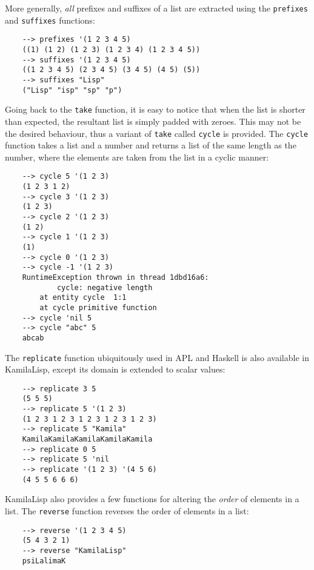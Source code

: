 More generally, \textit{all} prefixes and suffixes of a list are extracted using the \verb|prefixes| and \verb|suffixes| functions:

\begin{Verbatim}
    --> prefixes '(1 2 3 4 5)
    ((1) (1 2) (1 2 3) (1 2 3 4) (1 2 3 4 5))
    --> suffixes '(1 2 3 4 5)
    ((1 2 3 4 5) (2 3 4 5) (3 4 5) (4 5) (5))
    --> suffixes "Lisp"
    ("Lisp" "isp" "sp" "p")
\end{Verbatim}

Going back to the \verb|take| function, it is easy to notice that when the list is shorter than expected, the resultant list is simply padded with zeroes. This may not be the desired behaviour, thus a variant of \verb|take| called \verb|cycle| is provided. The \verb|cycle| function takes a list and a number and returns a list of the same length as the number, where the elements are taken from the list in a cyclic manner:

\begin{Verbatim}
    --> cycle 5 '(1 2 3)
    (1 2 3 1 2)
    --> cycle 3 '(1 2 3)
    (1 2 3)
    --> cycle 2 '(1 2 3)
    (1 2)
    --> cycle 1 '(1 2 3)
    (1)
    --> cycle 0 '(1 2 3)
    --> cycle -1 '(1 2 3)
    RuntimeException thrown in thread 1dbd16a6:
            cycle: negative length
        at entity cycle  1:1
        at cycle primitive function
    --> cycle 'nil 5
    --> cycle "abc" 5
    abcab
\end{Verbatim}

The \verb|replicate| function ubiquitously used in APL and Haskell is also available in KamilaLisp, except its domain is extended to scalar values:

\begin{Verbatim}
    --> replicate 3 5
    (5 5 5)
    --> replicate 5 '(1 2 3)
    (1 2 3 1 2 3 1 2 3 1 2 3 1 2 3)
    --> replicate 5 "Kamila"
    KamilaKamilaKamilaKamilaKamila
    --> replicate 0 5
    --> replicate 5 'nil
    --> replicate '(1 2 3) '(4 5 6)
    (4 5 5 6 6 6)
\end{Verbatim}

KamilaLisp also provides a few functions for altering the \textit{order} of elements in a list. The \verb|reverse| function reverses the order of elements in a list:

\begin{Verbatim}
    --> reverse '(1 2 3 4 5)
    (5 4 3 2 1)
    --> reverse "KamilaLisp"
    psiLalimaK
\end{Verbatim}

